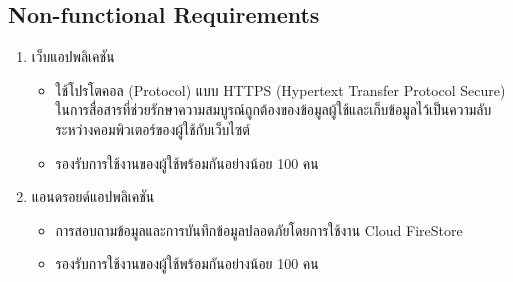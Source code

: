 \subsection{Non-functional Requirements}
		\begin{enumerate}
		\item เว็บแอปพลิเคชัน
		\begin{itemize}[label={--}]
			\item ใช้โปรโตคอล (Protocol) แบบ HTTPS (Hypertext Transfer Protocol Secure)  ในการสื่อสารที่ช่วยรักษาความสมบูรณ์ถูกต้องของข้อมูลผู้ใช้และเก็บข้อมูลไว้เป็นความลับระหว่างคอมพิวเตอร์ของผู้ใช้กับเว็บไซต์ 
			\item รองรับการใช้งานของผู้ใช้พร้อมกันอย่างน้อย 100 คน
		\end{itemize}
		\item แอนดรอยด์แอปพลิเคชัน
		\begin{itemize}[label={--}]
			\item การสอบถามข้อมูลและการบันทึกข้อมูลปลอดภัยโดยการใช้งาน Cloud FireStore
			\item รองรับการใช้งานของผู้ใช้พร้อมกันอย่างน้อย 100 คน
		\end{itemize}
	\end{enumerate}
	
